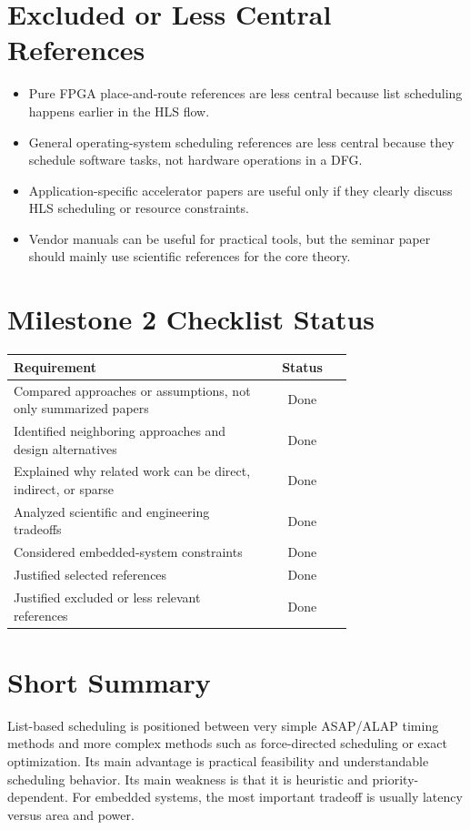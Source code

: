 \documentclass[11pt,a4paper]{article}
\begin{document}
\section{Excluded or Less Central References}

\begin{itemize}[leftmargin=*]
    \item Pure FPGA place-and-route references are less central because list scheduling happens earlier in the HLS flow.
    \item General operating-system scheduling references are less central because they schedule software tasks, not hardware operations in a DFG.
    \item Application-specific accelerator papers are useful only if they clearly discuss HLS scheduling or resource constraints.
    \item Vendor manuals can be useful for practical tools, but the seminar paper should mainly use scientific references for the core theory.
\end{itemize}

\section{Milestone 2 Checklist Status}

\begin{table}[h]
\centering
\begin{tabular}{p{0.74\linewidth}c}
\toprule
Requirement & Status \\
\midrule
Compared approaches or assumptions, not only summarized papers & Done \\
Identified neighboring approaches and design alternatives & Done \\
Explained why related work can be direct, indirect, or sparse & Done \\
Analyzed scientific and engineering tradeoffs & Done \\
Considered embedded-system constraints & Done \\
Justified selected references & Done \\
Justified excluded or less relevant references & Done \\
\bottomrule
\end{tabular}
\end{table}

\section*{Short Summary}

List-based scheduling is positioned between very simple ASAP/ALAP timing methods and more complex methods such as force-directed scheduling or exact optimization.
Its main advantage is practical feasibility and understandable scheduling behavior.
Its main weakness is that it is heuristic and priority-dependent.
For embedded systems, the most important tradeoff is usually latency versus area and power.



\end{document}
